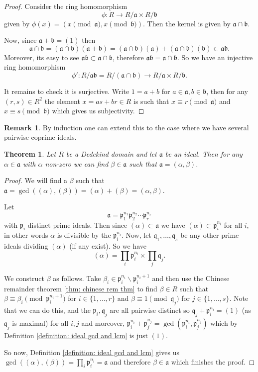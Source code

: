 \documentclass[11pt,a4paper]{report}
\theoremstyle{plain}
\newtheorem{thm}[subsection]{Theorem}
\theoremstyle{definition}
\theoremstyle{definition}
\newtheorem{rmrk}[subsection]{Remark}
\def\gothb{\mathfrak{b}}
\def\gothp{\mathfrak{p}}
\def\gothq{\mathfrak{q}}
\def \a{\alpha}
\def\gotha{\mathfrak{a}}
\def \lra{\longrightarrow}
\begin{document}
	\begin{proof}
		Consider the ring homomorphism \[\phi: R \to R/\gotha \times R/\gothb\] given by $\phi(x)=(x \pmod \gotha, x \pmod \gothb)$. Then the kernel is given by $\gotha \cap \gothb$.
		
		Now, since $\gotha+\gothb=(1)$ then \[\gotha \cap \gothb =(\gotha \cap \gothb)(\gotha+\gothb)=(\gotha \cap \gothb)(\gotha)+(\gotha \cap \gothb)(\gothb) \subset \gotha \gothb.\] Moreover, its easy to see $\gotha\gothb \subset \gotha \cap \gothb$, therefore $\gotha\gothb=\gotha \cap \gothb$. So we have an injective ring homomorphism \[\phi':R/ \gotha\gothb=R/(\gotha\cap \gothb) \lra R/\gotha \times R/\gothb.\]
		
		It remains to check it is surjective. Write $1=a+b$ for $a \in \gotha,b \in \gothb$, then for any $(r,s) \in R^2$ the element $x=as+br \in R$ is such that $x \equiv r \pmod \gotha$ and $x \equiv s \pmod \gothb$ which gives us subjectivity.
	\end{proof}
	
	\begin{rmrk}
		By induction one can extend this to the case where we have several pairwise coprime ideals.
	\end{rmrk}
	
	\begin{thm}
		Let $R$ be a Dedekind domain and let $\gotha$ be an ideal. Then for any $\a \in \gotha$ with $\a$ non-zero we can find $\beta \in \gotha$ such that $\gotha=(\a,\beta)$.
	\end{thm}
	
	
	\begin{proof}
		We will find a $\beta$ such that $\gotha=\gcd((\a),(\beta))=(\a)+(\beta)=(\a,\beta)$.
		
		Let \[\gotha=\gothp_1^{n_1}\gothp_2^{n_2}\cdots\gothp_r^{n_r}\] with $\gothp_i$ distinct prime ideals. Then since $(\a) \subset \gotha$ we have $(\a) \subset \gothp_i^{n_i}$ for all $i$, in other words $\a$ is divisible by the $\gothp_i^{n_i}$. Now, let $\gothq_1,\dots,\gothq_s$ be any other prime ideals dividing $(\a)$ (if any exist). So we have \[(\a)=\prod_i \gothp_i^{n_i} \times \prod_j \gothq_j.\]
		
		We construct $\beta$ as follows. Take $\beta_i \in \gothp_i^{n_i} \backslash \gothp_i^{n_i+1}$ and then use the Chinese remainder theorem \ref{thm: chinese rem thm} to find $\beta \in R$ such that $\beta \equiv \beta_i \pmod {\gothp_i^{n_i+1}}$ for $i \in \{1,\dots,r\}$ and $\beta \equiv 1 \pmod {\gothq_j}$ for $j \in \{1,\dots,s\}$. Note that we can do this, and the $\gothp_i,\gothq_j$ are all pairwise distinct so $\gothq_j+\gothp_i^{n_i}=(1)$ (as $\gothq_j$ is maximal) for all $i,j$ and moreover, $\gothp_i^{n_i}+\gothp_j^{n_j}=\gcd(\gothp_i^{n_i},\gothp_j^{n_j})$ which by Definition \ref{definition: ideal gcd and lcm} is just $(1)$.
		
		So now,  Definition \ref{definition: ideal gcd and lcm} gives us $\gcd((\a),(\beta))=\prod_i \gothp_i^{n_i}=\gotha$ and therefore $\beta \in \gotha$ which finishes the proof.
		
		
	\end{proof}
	
\end{document}
